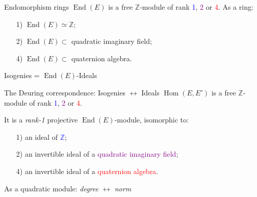 \documentclass[aspectratio=169]{beamer}
\newcommand{\End}{\operatorname{End}}
\newcommand{\Hom}{\operatorname{Hom}}
\begin{document}

\begin{frame}{Endomorphism rings}
  \large $\End(E)$ is a free $ℤ$-module of rank \textcolor{blue}{1},
  \textcolor{purple}{2} or \textcolor{red}{4}. As a ring:

  \bigskip
  \begin{enumerate}
    \setlength{\itemsep}{1em}
  \item[\color{blue}1)] $\End(E) ≃ ℤ$;
  \item[\color{purple}2)] $\End(E) ⊂$ quadratic imaginary field;
  \item[\color{red}4)] $\End(E) ⊂$ quaternion algebra.
  \end{enumerate}
\end{frame}


\begin{frame}{Isogenies = $\End(E)$-Ideals}
  \large\centering
\end{frame}


\begin{frame}{The Deuring correspondence: Isogenies $\longleftrightarrow$ Ideals}
  \large $\Hom(E,E')$ is a free $ℤ$-module of rank
  \textcolor{blue}{1}, \textcolor{purple}{2} or \textcolor{red}{4}.

  \bigskip
  It is a \emph{rank-1} projective $\End(E)$-module, isomorphic to:

  \bigskip
  \begin{enumerate}
    \setlength{\itemsep}{1em}
  \item[\color{blue}1)] an ideal of \textcolor{blue}{$ℤ$};
  \item[\color{purple}2)] an invertible ideal of a
    \textcolor{purple}{quadratic imaginary field};
  \item[\color{red}4)] an invertible ideal of a
    \textcolor{red}{quaternion algebra}.
  \end{enumerate}

  \bigskip
  As a quadratic module: \emph{degree $\longleftrightarrow$ norm}
\end{frame}
\end{document}
